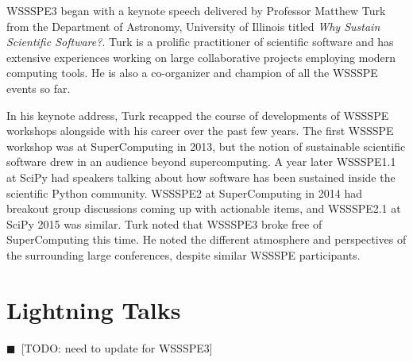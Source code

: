 \documentclass[11pt, oneside]{amsart}
\newcommand{\todo}[1]{{\color{blue}$\blacksquare$~\textsf{[TODO: #1]}}}
\newcommand{\note}[1]{ {\textcolor{blueish}    { ***Note:      #1 }}}
\begin{document}
WSSSPE3 began with a keynote speech delivered by Professor Matthew
Turk from the Department of Astronomy, University of Illinois titled \emph{Why
Sustain Scientific Software?}. Turk is a prolific practitioner of scientific
software and has extensive experiences working on large collaborative projects
employing modern computing tools. He is also a co-organizer and champion of all
the WSSSPE events so far.

In his keynote address, Turk recapped the course of developments of WSSSPE
workshops alongside with his career over the past few years. The first WSSSPE
workshop was at SuperComputing in 2013, but the notion of sustainable scientific
software drew in an audience beyond supercomputing. A year later WSSSPE1.1 at
SciPy had speakers talking about how software has been sustained inside the
scientific Python community. WSSSPE2 at SuperComputing in 2014 had breakout
group discussions coming up with actionable items, and WSSSPE2.1 at SciPy 2015
was similar. Turk noted that WSSSPE3 broke free of SuperComputing this time. He
noted the different atmosphere and perspectives of the surrounding large
conferences, despite similar WSSSPE participants.




\section{Lightning Talks} \label{sec:lightning}
\todo{need to update for WSSSPE3}
\begin{comment}
\note{
\href{http://wssspe.researchcomputing.org.uk/wssspe3/agenda/}{Slides.}}
\end{comment}
\end{document}
